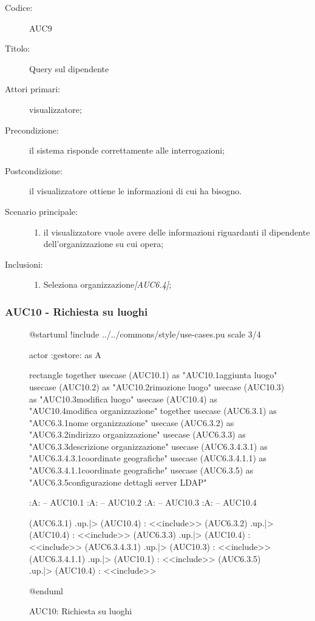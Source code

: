 \documentclass[casi-duso]{subfiles}
\begin{document}
\begin{description}
  \item[Codice:] AUC9
  \item[Titolo:] Query sul dipendente
  \item[Attori primari:] visualizzatore;
  \item[Precondizione:] il sistema risponde correttamente alle interrogazioni;
  \item[Postcondizione:] il visualizzatore ottiene le informazioni di cui ha bisogno.
  \item[Scenario principale:]
  \begin{enumerate}
    \item il visualizzatore vuole avere delle informazioni riguardanti il dipendente dell'organizzazione su cui opera;
  \end{enumerate}
  \item[Inclusioni:]
  \begin{enumerate}
    \item Seleziona organizzazione\emph{[AUC6.4]};
  \end{enumerate}
\end{description}

\subsubsection{AUC10 - Richiesta su luoghi}%
\label{subsub:AUC10}

\begin{figure}[h!]
  \centering
  \begin{plantuml}
  @startuml
  !include ../../commons/style/use-cases.pu
  scale 3/4

  actor :gestore: as A

  rectangle {
    together {
      usecase (AUC10.1) as "AUC10.1\nRichiesta aggiunta luogo"
      usecase (AUC10.2) as "AUC10.2\nRichiesta rimozione luogo"
      usecase (AUC10.3) as "AUC10.3\nRichiesta modifica luogo"
      usecase (AUC10.4) as "AUC10.4\nRichiesta modifica organizzazione"
    }
    together {
      usecase (AUC6.3.1) as "AUC6.3.1\nModifica nome organizzazione"
      usecase (AUC6.3.2) as "AUC6.3.2\nModifica indirizzo organizzazione"
      usecase (AUC6.3.3) as "AUC6.3.3\nModifica descrizione organizzazione"
      usecase (AUC6.3.4.3.1) as "AUC6.3.4.3.1\nModifica coordinate geografiche"
      usecase (AUC6.3.4.1.1) as "AUC6.3.4.1.1\nInserisci coordinate geografiche"
      usecase (AUC6.3.5) as "AUC6.3.5\nModifica configurazione dettagli server LDAP"
    }
  }

  :A: -- AUC10.1
  :A: -- AUC10.2
  :A: -- AUC10.3
  :A: -- AUC10.4


  (AUC6.3.1) .up.|> (AUC10.4) : <<include>>
  (AUC6.3.2) .up.|> (AUC10.4) : <<include>>
  (AUC6.3.3) .up.|> (AUC10.4) : <<include>>
  (AUC6.3.4.3.1) .up.|> (AUC10.3) : <<include>>
  (AUC6.3.4.1.1) .up.|> (AUC10.1) : <<include>>
  (AUC6.3.5) .up.|> (AUC10.4) : <<include>>

  @enduml
  \end{plantuml}
  \caption{AUC10: Richiesta su luoghi}
  \label{fig:auc10}
\end{figure}
\end{document}
